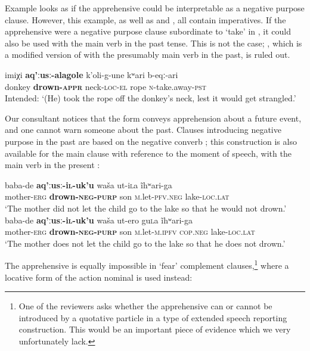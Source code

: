 \documentclass[output=paper,colorlinks,citecolor=brown]{langscibook}
\begin{document}
\noindent Example  looks as if the apprehensive could be interpretable as a negative purpose clause. However, this example, as well as  and , all contain imperatives. If the apprehensive were a negative purpose clause subordinate to `take' in , it could also be used with the main verb in the past tense. This is not the case; , which is a modified version of  with the presumably main verb in the past, is ruled out. 

\ea \label{ex:DD73}
\gll *imiχi \textbf{aq'ːusː-alagole} k'oli-g-une kʷari b-eqː-ari \\
donkey \textbf{drown-\textsc{appr}} neck-\textsc{loc-el} rope \textsc{n}-take.away-\textsc{pst} \\
\glt Intended: `(He) took the rope off the donkey's neck, lest it would get strangled.' 
\z


 Our consultant notices that the form conveys apprehension about a future event, and one cannot warn someone about the past. Clauses introducing negative purpose in the past are based on the negative converb ; this construction is also available for the main clause with reference to the moment of speech, with the main verb in the present :



\ea \label{ex:DD74}
\ea \label{ex:DD74a}
\gll baba-de \textbf{aq'ːusː-i\textsc{l}-uk'u} waša ut-i\textsc{l}a \~ihʷari-ga \\
mother-\textsc{erg} \textbf{drown-\textsc{neg-purp}} son \textsc{m}.let-\textsc{pfv.neg} lake-\textsc{loc.lat} \\
\glt `The mother did not let the child go to the lake so that he would not drown.' \\
\ex \label{ex:DD74b}
\gll baba-de \textbf{aq'ːusː-i\textsc{l}-uk'u} waša ut-ero gu\textsc{l}a \~ihʷari-ga \\
mother-\textsc{erg} \textbf{drown-\textsc{neg-purp}} son \textsc{m}.let-\textsc{m.ipfv} \textsc{cop.neg} lake-\textsc{loc.lat} \\
\glt `The mother does not let the child go to the lake so that he does not drown.'
\z
\z


 The apprehensive is equally impossible in `fear' complement clauses,\footnote{One of the reviewers asks whether the apprehensive can or cannot be introduced by a quotative particle in a type of extended speech reporting construction. This would be an important piece of evidence which we very unfortunately lack.} where a locative form of the action nominal is used instead:
\end{document}
